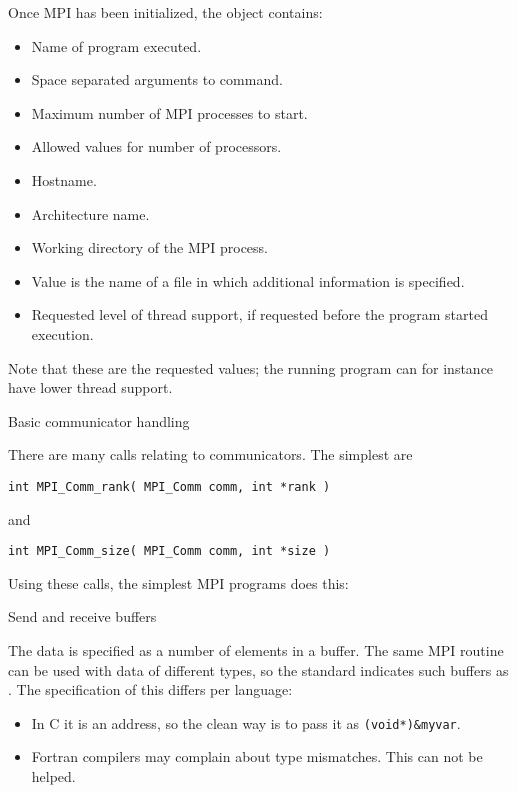 Once MPI has been initialized, the  object contains:
\begin{itemize}
\item {}
  Name of program executed.
\item  {}
  Space separated arguments to command.
\item  {}
  Maximum number of MPI processes to start.
\item   {}
  Allowed values for number of processors.
\item   {}
  Hostname.
\item   {}
  Architecture name.
\item   {}
  Working directory of the MPI process.
\item   {}
  Value is the name of a file in which additional information is specified.
\item   {}
  Requested level of thread support, if requested before the program started execution.
\end{itemize}
Note that these are the requested values; the running program can for instance
have lower thread support.

 {Basic communicator handling}

There are many calls relating to communicators. The simplest are
\begin{verbatim}
int MPI_Comm_rank( MPI_Comm comm, int *rank )
\end{verbatim}
and 
\begin{verbatim}
int MPI_Comm_size( MPI_Comm comm, int *size )
\end{verbatim}

Using these calls, the simplest MPI programs does this:

 {Send and receive buffers}

The data is specified as a number of elements in a buffer. The same
MPI routine can be used with data of different types, so the standard
indicates such buffers as . The specification of
this differs per language:
\begin{itemize}
\item In C it is an address, so the clean way is to pass it as
  \verb+(void*)&myvar+.
\item Fortran compilers may complain about type mismatches. This can
  not be helped.
\end{itemize}

